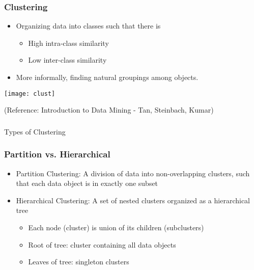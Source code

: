 
\begin{frame}[fragile]\frametitle{Clustering}
\begin{itemize}
\item  Organizing data into classes such that there is
\begin{itemize}
\item  High intra-class similarity
\item  Low inter-class similarity 
\end{itemize}
\item  More informally, finding natural groupings among objects. 
\end{itemize}
\begin{center}
\texttt{[image: clust]}
\end{center}
\tiny{(Reference: Introduction to Data Mining - Tan, Steinbach, Kumar)}

\end{frame}

\begin{frame}[fragile]\frametitle{}
\begin{center}
{\Large Types of Clustering}
\end{center}
\end{frame}


\begin{frame}[fragile]\frametitle{Partition vs. Hierarchical}

\begin{itemize}
\item Partition Clustering: A division of data into non-overlapping clusters, such that each data object is in exactly one subset
\item Hierarchical Clustering: A set of nested clusters organized as a hierarchical tree 
\begin{itemize}
\item Each node (cluster) is union of its children (subclusters)
\item Root of tree: cluster containing all data objects
\item Leaves of tree: singleton clusters
\end{itemize}
\end{itemize}
\end{frame}

